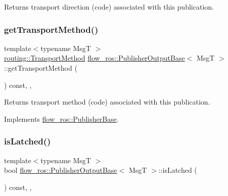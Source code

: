 Returns transport direction (code) associated with this publication. 

\mbox{\label{classflow__ros_1_1_publisher_output_base_ac052232bb5a6fb9ea04ab61453d14f69}} 
\subsubsection{\texorpdfstring{get\+Transport\+Method()}{getTransportMethod()}}
{\footnotesize\ttfamily template$<$typename MsgT $>$ \\
\hyperlink{transport__info_8h_ae57afcf849a5bdb82b958347c6ccc57b}{routing\+::\+Transport\+Method} \hyperlink{classflow__ros_1_1_publisher_output_base}{flow\+\_\+ros\+::\+Publisher\+Output\+Base}$<$ MsgT $>$\+::get\+Transport\+Method (\begin{DoxyParamCaption}{ }\end{DoxyParamCaption}) const\hspace{0.3cm}{\ttfamily [inline]}, {\ttfamily [final]}, {\ttfamily [virtual]}}



Returns transport method (code) associated with this publication. 



Implements \hyperlink{classflow__ros_1_1_publisher_base_ad0cd41b4d2a8e4697610643c7e90d8c7}{flow\+\_\+ros\+::\+Publisher\+Base}.

\mbox{\label{classflow__ros_1_1_publisher_output_base_a34acf851a9aa31ece46b6b5887b3db24}} 
\subsubsection{\texorpdfstring{is\+Latched()}{isLatched()}}
{\footnotesize\ttfamily template$<$typename MsgT $>$ \\
bool \hyperlink{classflow__ros_1_1_publisher_output_base}{flow\+\_\+ros\+::\+Publisher\+Output\+Base}$<$ MsgT $>$\+::is\+Latched (\begin{DoxyParamCaption}{ }\end{DoxyParamCaption}) const\hspace{0.3cm}{\ttfamily [inline]}, {\ttfamily [final]}, {\ttfamily [virtual]}}



